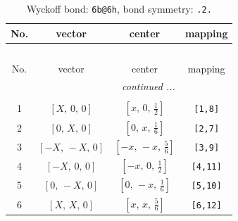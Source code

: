 \documentclass[fleqn,8pt]{jsarticle}
\begin{document}
\begin{longtable}{cccc}
\caption{Wyckoff bond: {\tt 6b@6h}, bond symmetry: {\tt .2.}}
 \\
 \hline \hline
No. & vector & center & mapping \\ \hline \endfirsthead

\multicolumn{3}{l}{\tablename\ \thetable{}} \\
 \hline \hline
No. & vector & center & mapping \\ \hline \endhead

 \hline \hline
\multicolumn{3}{r}{\footnotesize\it continued ...} \\ \endfoot

 \hline \hline
\multicolumn{3}{r}{} \\ \endlastfoot

1 & $\left[ X,\, 0,\, 0 \right]$ & $\left[ x,\, 0,\, \frac{1}{2} \right]$ & {\tt [1,8]} \\ \hline
2 & $\left[ 0,\, X,\, 0 \right]$ & $\left[ 0,\, x,\, \frac{1}{6} \right]$ & {\tt [2,7]} \\ \hline
3 & $\left[ - X,\, - X,\, 0 \right]$ & $\left[ - x,\, - x,\, \frac{5}{6} \right]$ & {\tt [3,9]} \\ \hline
4 & $\left[ - X,\, 0,\, 0 \right]$ & $\left[ - x,\, 0,\, \frac{1}{2} \right]$ & {\tt [4,11]} \\ \hline
5 & $\left[ 0,\, - X,\, 0 \right]$ & $\left[ 0,\, - x,\, \frac{1}{6} \right]$ & {\tt [5,10]} \\ \hline
6 & $\left[ X,\, X,\, 0 \right]$ & $\left[ x,\, x,\, \frac{5}{6} \right]$ & {\tt [6,12]} \\
\end{longtable}
\renewcommand{\arraystretch}{1.2}
\end{document}
